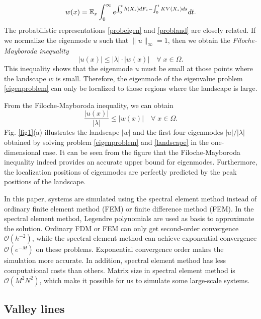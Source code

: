 \documentclass[a4paper,11pt]{article}
\begin{document}
\begin{equation}\label{probland}
w(x) = \mathbb{E}_x \int_{0}^{\infty} e^{\int_{0}^{t} h(X_s) d F_s - \int_{0}^{t} KV(X_s) ds} dt.
\end{equation}
The probabilistic representations \eqref{probeigen} and \eqref{probland} are closely related. If we normalize the eigenmode $u$ such that $\|u\|_\infty = 1$, then we obtain the \emph{Filoche-Mayboroda inequality}
\begin{equation*}
|u(x)| \leq |\lambda| \cdot |w(x)| \quad \forall \; x \in \Omega.
\end{equation*}
This inequality shows that the eigenmode $u$ must be small at those points where the landscape $w$ is small. Therefore, the eigenmode of the eigenvalue problem \eqref{eigenproblem} can only be localized to those regions where the landscape is large.

From the Filoche-Mayboroda inequality, we can obtain
\begin{equation*}
\frac{|u(x)|}{|\lambda|} \leq |w(x)| \quad \forall \; x \in \Omega.
\end{equation*}
Fig. \ref{fig1}(a) illustrates the landscape $|w|$ and the first four eigenmodes $|u| / |\lambda|$ obtained by solving problem \eqref{eigenproblem} and \eqref{landscape} in the one-dimensional case. It can be seen from the figure that the Filoche-Mayboroda inequality indeed provides an accurate upper bound for eigenmodes. Furthermore, the localization positions of eigenmodes are perfectly predicted by the peak positions of the landscape.

In this paper, systems are simulated using the spectral element method instead of ordinary finite element method (FEM) or finite difference method (FEM). In the spectral element method, Legendre polynomials are used as basis to approximate the solution. Ordinary FDM or FEM can only get second-order convergence $\mathcal{O}(h^{-2})$, while the spectral element method can achieve exponential convergence $\mathcal{O}(e^{-M})$ on these problems. Exponential convergence order makes the simulation more accurate. In addition, spectral element method has less computational costs than others. Matrix size in spectral element method is $\mathcal{O}(M^2 N^2)$, which make it possible for us to simulate some large-scale systems.

\subsection{Valley lines}
\end{document}
